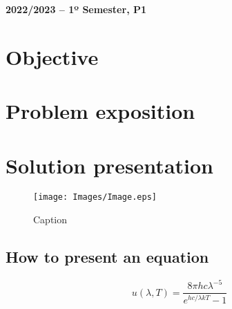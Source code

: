 \documentclass[12pt]{article}
\begin{document}
\begin{center}
    \large \bf 2022/2023 -- 1º Semester, P1
\end{center}

\thispagestyle{empty}

\setcounter{page}{0}

\newpage

\tableofcontents 

\newpage

\section{Objective}

\lipsum[1] \cite{refs1}

\section{Problem exposition} 

\lipsum[1] \cite{refs2}

\lipsum[2-3]

\newpage

\section{Solution presentation}

\lipsum[1]

\begin{figure}[H]
	\begin{center}
 		\texttt{[image: Images/Image.eps]}
 		\caption{Caption}
 		\label{fig1:graph}
	\end{center} 
\end{figure}

\blindduck[maths] \cite{refs1, refs2, refs3}

\subsection{How to present an equation}

\begin{equation}
    u(\lambda,T)=\frac{8\pi hc\lambda^{-5}}{e^{hc/\lambda kT}-1}
    \label{eq:1}
\end{equation}
\end{document}
